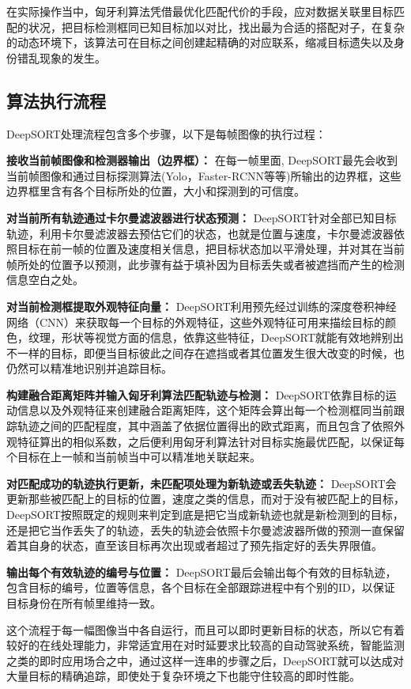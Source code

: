在实际操作当中，匈牙利算法凭借最优化匹配代价的手段，应对数据关联里目标匹配的状况，把目标检测框同已知目标加以对比，找出最为合适的搭配对子，在复杂的动态环境下，该算法可在目标之间创建起精确的对应联系，缩减目标遗失以及身份错乱现象的发生。

\subsection{算法执行流程}

DeepSORT处理流程包含多个步骤，以下是每帧图像的执行过程：

\textbf{接收当前帧图像和检测器输出（边界框）： }在每一帧里面, DeepSORT最先会收到当前帧图像和通过目标探测算法(Yolo，Faster-RCNN等等)所输出的边界框，这些边界框里含有各个目标所处的位置，大小和探测到的可信度。

\textbf{对当前所有轨迹通过卡尔曼滤波器进行状态预测： }DeepSORT针对全部已知目标轨迹，利用卡尔曼滤波器去预估它们的状态，也就是位置与速度，卡尔曼滤波器依照目标在前一帧的位置及速度相关信息，把目标状态加以平滑处理，并对其在当前帧所处的位置予以预测，此步骤有益于填补因为目标丢失或者被遮挡而产生的检测信息空白之处。

\textbf{对当前检测框提取外观特征向量： }DeepSORT利用预先经过训练的深度卷积神经网络（CNN）来获取每一个目标的外观特征，这些外观特征可用来描绘目标的颜色，纹理，形状等视觉方面的信息，依靠这些特征，DeepSORT就能有效地辨别出不一样的目标，即便当目标彼此之间存在遮挡或者其位置发生很大改变的时候，也仍然可以精准地识别并追踪目标。

\textbf{构建融合距离矩阵并输入匈牙利算法匹配轨迹与检测： }DeepSORT依靠目标的运动信息以及外观特征来创建融合距离矩阵，这个矩阵会算出每一个检测框同当前跟踪轨迹之间的匹配程度，其中涵盖了依据位置得出的欧式距离，而且包含了依照外观特征算出的相似系数，之后便利用匈牙利算法针对目标实施最优匹配，以保证每个目标在上一帧和当前帧当中可以精准地关联起来。

\textbf{对匹配成功的轨迹执行更新，未匹配项处理为新轨迹或丢失轨迹： }DeepSORT会更新那些被匹配上的目标的位置，速度之类的信息，而对于没有被匹配上的目标，DeepSORT按照既定的规则来判定到底是把它当成新轨迹也就是新检测到的目标，还是把它当作丢失了的轨迹，丢失的轨迹会依照卡尔曼滤波器所做的预测一直保留着其自身的状态，直至该目标再次出现或者超过了预先指定好的丢失界限值。

\textbf{输出每个有效轨迹的编号与位置： }DeepSORT最后会输出每个有效的目标轨迹，包含目标的编号，位置等信息，各个目标在全部跟踪进程中有个别的ID，以保证目标身份在所有帧里维持一致。

这个流程于每一幅图像当中各自运行，而且可以即时更新目标的状态，所以它有着较好的在线处理能力，非常适宜用在对时延要求比较高的自动驾驶系统，智能监测之类的即时应用场合之中，通过这样一连串的步骤之后，DeepSORT就可以达成对大量目标的精确追踪，即使处于复杂环境之下也能守住较高的即时性能。

